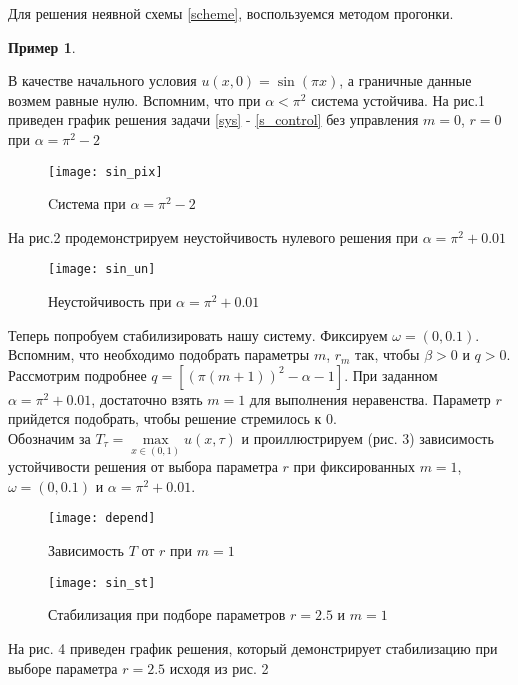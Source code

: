 Для решения неявной схемы \eqref{scheme}, воспользуемся методом прогонки.

\newtheorem{exmp}{Пример}[section]
\begin{exmp}
\end{exmp}
В качестве начального условия $u(x, 0) = \sin{(\pi x)}$, а граничные данные возмем равные нулю. Вспомним, что при $\alpha < \pi^2$ система устойчива. На рис.1 приведен график решения задачи \eqref{sys} - \eqref{s_control} без управления $m = 0$, $r = 0$ при $\alpha = \pi^2 - 2$

\begin{figure}[hb]
  \centering
  \texttt{[image: sin\_pix]}
  \caption{Cистема при $\alpha = \pi^2 - 2$}
\end{figure}

На рис.2 продемонстрируем неустойчивость нулевого решения при $\alpha = \pi^2 + 0.01$

\begin{figure}[H]
  \centering
  \texttt{[image: sin\_un]}
  \caption{Неустойчивость при $\alpha = \pi^2 + 0.01$}
\end{figure}

Теперь попробуем стабилизировать нашу систему. Фиксируем $\omega = (0, 0.1)$. Вспомним, что необходимо подобрать параметры $m$, $r_m$ так, чтобы $\beta > 0$ и $q > 0$. Рассмотрим подробнее $q = [(\pi(m + 1))^2 - \alpha - 1]$. При заданном $\alpha = \pi^2 + 0.01$, достаточно взять $m = 1$ для выполнения неравенства. Параметр $r$ прийдется подобрать, чтобы решение стремилось к 0.\\

Обозначим за $T_{\tau} = \max\limits_{x \in (0, 1)}{u(x, \tau)}$ и проиллюстрируем (рис. 3) зависимость устойчивости решения от выбора параметра $r$ при фиксированных $m = 1$, $\omega = (0, 0.1)$ и $\alpha = \pi^2 + 0.01$.

\begin{figure}[H]
  \centering
  \texttt{[image: depend]}
  \caption{Зависимость $T$ от $r$ при $m = 1$}
\end{figure}

\begin{figure}[H]
  \centering
  \texttt{[image: sin\_st]}
  \caption{Стабилизация при подборе параметров $r = 2.5$ и $m = 1$}
\end{figure}

На рис. 4 приведен график решения, который демонстрирует стабилизацию при выборе параметра $r = 2.5$ исходя из рис. 2

